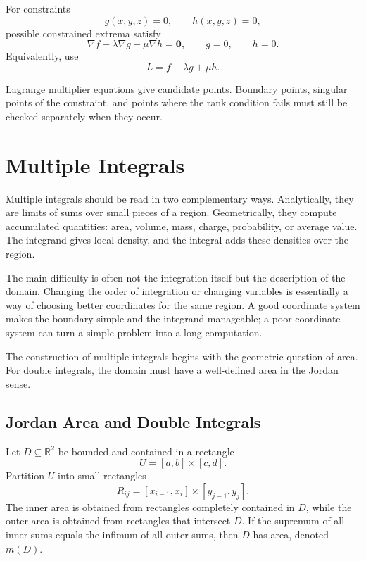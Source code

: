\begin{theorem}
For constraints
\[
    g(x,y,z)=0,
    \qquad
    h(x,y,z)=0,
\]
possible constrained extrema satisfy
\[
    \nabla f+\lambda\nabla g+\mu\nabla h=\mathbf{0},
    \qquad
    g=0,
    \qquad
    h=0.
\]
Equivalently, use
\[
    L=f+\lambda g+\mu h.
\]
\end{theorem}

\begin{note}
Lagrange multiplier equations give candidate points. Boundary points, singular points of the constraint, and points where the rank condition fails must still be checked separately when they occur.
\end{note}

\section{Multiple Integrals}


Multiple integrals should be read in two complementary ways. Analytically, they are limits of sums over small pieces of a region. Geometrically, they compute accumulated quantities: area, volume, mass, charge, probability, or average value. The integrand gives local density, and the integral adds these densities over the region.

The main difficulty is often not the integration itself but the description of the domain. Changing the order of integration or changing variables is essentially a way of choosing better coordinates for the same region. A good coordinate system makes the boundary simple and the integrand manageable; a poor coordinate system can turn a simple problem into a long computation.

The construction of multiple integrals begins with the geometric question of area. For double integrals, the domain must have a well-defined area in the Jordan sense.

\subsection{Jordan Area and Double Integrals}

Let $D\subseteq\mathbb{R}^2$ be bounded and contained in a rectangle
\[
    U=[a,b]\times[c,d].
\]
Partition $U$ into small rectangles
\[
    R_{ij}=[x_{i-1},x_i]\times[y_{j-1},y_j].
\]
The inner area is obtained from rectangles completely contained in $D$, while the outer area is obtained from rectangles that intersect $D$. If the supremum of all inner sums equals the infimum of all outer sums, then $D$ has area, denoted $m(D)$.

